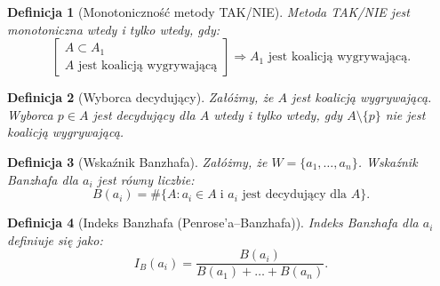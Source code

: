 \documentclass[12pt,a4paper]{article}
\theoremstyle{break}
\newtheorem{definition}{Definicja}[section]
\begin{document}
\begin{definition}[Monotoniczność metody TAK/NIE]
	Metoda TAK/NIE jest monotoniczna wtedy i tylko wtedy, gdy:  
	$$
	\begin{bmatrix}
		A \subset A_1 \\
		A \text{ jest koalicją wygrywającą}
	\end{bmatrix}
	\Rightarrow A_1 \text{ jest koalicją wygrywającą.}
	$$
\end{definition}

\begin{definition}[Wyborca decydujący]
	Załóżmy, że $A$ jest koalicją wygrywającą.  
	Wyborca $p \in A$ jest decydujący dla $A$ wtedy i tylko wtedy, gdy $A \setminus \{p\}$ nie jest koalicją wygrywającą.
\end{definition}

\begin{definition}[Wskaźnik Banzhafa]
	Załóżmy, że $W = \{a_1, \dots, a_n\}$.  
	Wskaźnik Banzhafa dla $a_i$ jest równy liczbie:
	$$B(a_i) = \# \{ A : a_i \in A \; \text{i $a_i$ jest decydujący dla $A$} \}.$$
\end{definition}

\begin{definition}[Indeks Banzhafa (Penrose’a–Banzhafa)]
	Indeks Banzhafa dla $a_i$ definiuje się jako:
	$$I_B(a_i) = \frac{B(a_i)}{B(a_1) + \dots + B(a_n)}.$$
\end{definition}
\end{document}
